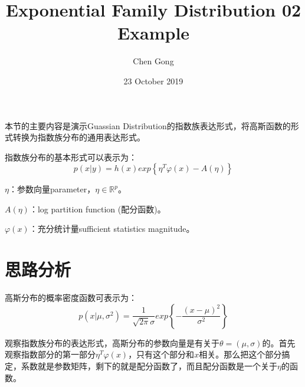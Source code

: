 \documentclass[a4paper]{article}
\title{Exponential Family Distribution 02 Example}
\author{Chen Gong}
\date{23 October 2019}
\begin{document}
\maketitle

本节的主要内容是演示Guassian Distribution的指数族表达形式，将高斯函数的形式转换为指数族分布的通用表达形式。

指数族分布的基本形式可以表示为：
\begin{equation}
    p(x|y)=h(x)exp\left\{ \eta^T\varphi(x)-A(\eta) \right\}
\end{equation}

$\eta$：参数向量parameter，$\eta \in \mathbb{R}^p$。

$A(\eta)$：log partition function (配分函数)。

$\varphi(x)$：充分统计量sufficient statistics magnitude。

\section{思路分析}
高斯分布的概率密度函数可表示为：
\begin{equation}
    p(x|\mu,\sigma^2) = \frac{1}{\sqrt{2\pi}\sigma}exp\left\{ -\frac{(x-\mu)^2}{\sigma^2} \right\}
\end{equation}

观察指数族分布的表达形式，高斯分布的参数向量是有关于$\theta=(\mu,\sigma)$的。首先观察指数部分的第一部分$\eta^T\varphi(x)$，只有这个部分和$x$相关。那么把这个部分搞定，系数就是参数矩阵，剩下的就是配分函数了，而且配分函数是一个关于$\eta$的函数。
\end{document}
